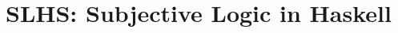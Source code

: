 \documentclass[thesis.tex]{subfiles}
\begin{document}
\chapter{SLHS: Subjective Logic in Haskell}



\end{document}
